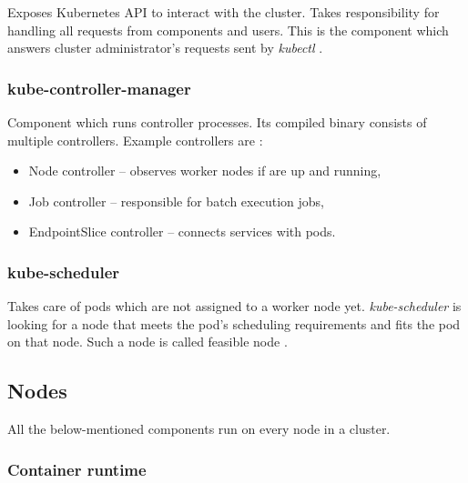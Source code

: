 Exposes Kubernetes API to interact with the cluster. Takes responsibility for handling all requests from components and users. This is the component which answers cluster administrator's requests sent by \textit{kubectl} \cite{KubernetesDocs}.


\subsubsection{kube-controller-manager}
\label{sec:kubeControllerManager}

Component which runs controller processes. Its compiled binary consists of multiple controllers. Example controllers are \cite{KubernetesDocs}:

\begin{itemize}
    \item Node controller -- observes worker nodes if are up and running,
    \item Job controller -- responsible for batch execution jobs,
    \item EndpointSlice controller -- connects services with pods.
\end{itemize}


\subsubsection{kube-scheduler}
\label{sec:kubeScheduler}

Takes care of pods which are not assigned to a worker node yet. \textit{kube-scheduler} is looking for a node that meets the pod's scheduling requirements and fits the pod on that node. Such a node is called feasible node \cite{KubernetesDocs}.


\subsection{Nodes}
\label{sec:k8sNodes}
All the below-mentioned components run on every node in a cluster.

\subsubsection{Container runtime}
\label{sec:containerRuntime}

